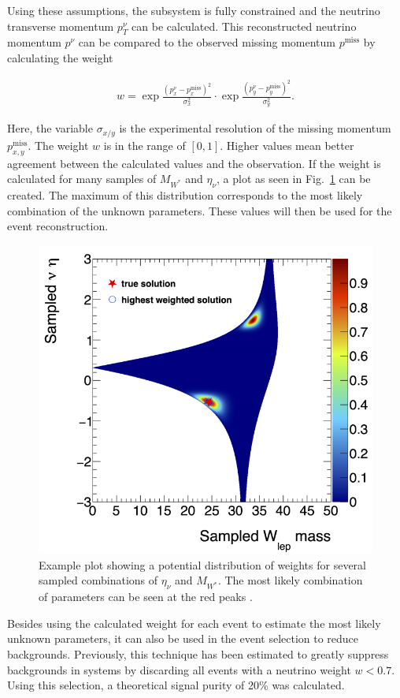 \documentclass[bachelor,ngerman,english]{GAUBM}
\begin{document}
Using these assumptions, the \HWW subsystem is fully constrained \cite{neutrino_weighting:adaptation} and the neutrino transverse momentum $p_T^\nu$ can be calculated. This reconstructed neutrino momentum $p^\nu$ can be compared to the observed missing momentum $p^\text{miss}$ by calculating the weight 

\begin{align}
    w = \exp{\frac{(p_x^\nu-p_x^\text{miss})^2}{\sigma_x^2}} \cdot \exp{\frac{(p_y^\nu-p_y^\text{miss})^2}{\sigma_y^2}}.
\end{align}

Here, the variable $\sigma_{x/y}$ is the experimental resolution of the missing momentum $p_{x,y}^\text{miss}$. The weight $w$ is in the range of $[0,1]$. Higher values mean better agreement between the calculated values and the observation. If the weight is calculated for many samples of $M_{W^*}$ and $\eta_\nu$, a plot as seen in Fig.~\ref{fig:neutrino_weighting} can be created. The maximum of this distribution corresponds to the most likely combination of the unknown parameters. These values will then be used for the event reconstruction.

\begin{figure}[t]
    \centering
    \includegraphics[width=.60\textwidth]{figures/methods/neutrino_weighting.png}
    \caption{Example plot showing a potential distribution of weights for several sampled combinations of $\eta_\nu$ and $M_{W^*}$. The most likely combination of parameters can be seen at the red peaks \cite{neutrino_weighting:adaptation}.}
    \label{fig:neutrino_weighting}
\end{figure}

Besides using the calculated weight for each event to estimate the most likely unknown parameters, it can also be used in the event selection to reduce backgrounds. Previously, this technique has been estimated to greatly suppress backgrounds in \HWW systems \cite{neutrino_weighting:adaptation} by discarding all events with a neutrino weight $w<0.7$. Using this selection, a theoretical signal purity of 20\% was calculated.
\end{document}
